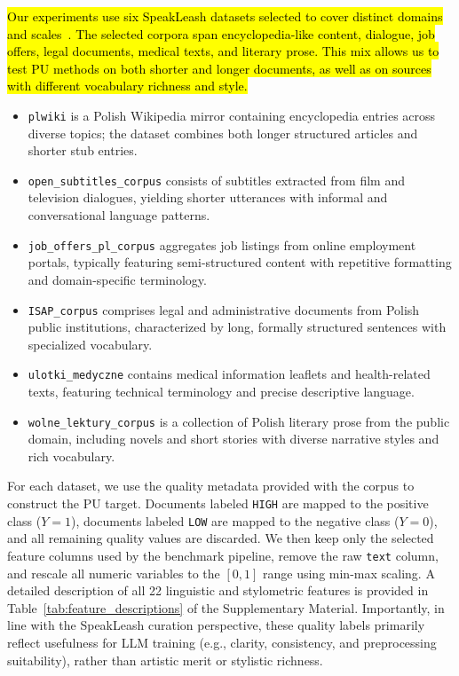 \documentclass[applsci,article,submit,pdftex,moreauthors]{Definitions/mdpi}
\newcommand{\rev}[1]{\hl{#1}}
\begin{document}
\rev{Our experiments use six SpeakLeash datasets selected to cover distinct domains and scales~\cite{speakleash}. The selected corpora span encyclopedia-like content, dialogue, job offers, legal documents, medical texts, and literary prose. This mix allows us to test PU methods on both shorter and longer documents, as well as on sources with different vocabulary richness and style.}

\begin{itemize}
\item \texttt{plwiki} is a Polish Wikipedia mirror containing encyclopedia entries across diverse topics; the dataset combines both longer structured articles and shorter stub entries.
\item \texttt{open\_subtitles\_corpus} consists of subtitles extracted from film and television dialogues, yielding shorter utterances with informal and conversational language patterns.
\item \texttt{job\_offers\_pl\_corpus} aggregates job listings from online employment portals, typically featuring semi-structured content with repetitive formatting and domain-specific terminology.
\item \texttt{ISAP\_corpus} comprises legal and administrative documents from Polish public institutions, characterized by long, formally structured sentences with specialized vocabulary.
\item \texttt{ulotki\_medyczne} contains medical information leaflets and health-related texts, featuring technical terminology and precise descriptive language.
\item \texttt{wolne\_lektury\_corpus} is a collection of Polish literary prose from the public domain, including novels and short stories with diverse narrative styles and rich vocabulary.
\end{itemize}

For each dataset, we use the quality metadata provided with the corpus to construct the PU target. Documents labeled \texttt{HIGH} are mapped to the positive class ($Y=1$), documents labeled \texttt{LOW} are mapped to the negative class ($Y=0$), and all remaining quality values are discarded. We then keep only the selected feature columns used by the benchmark pipeline, remove the raw \texttt{text} column, and rescale all numeric variables to the $[0,1]$ range using min-max scaling. A detailed description of all 22 linguistic and stylometric features is provided in Table~\ref{tab:feature_descriptions} of the Supplementary Material. Importantly, in line with the SpeakLeash curation perspective, these quality labels primarily reflect usefulness for LLM training (e.g., clarity, consistency, and preprocessing suitability), rather than artistic merit or stylistic richness.
\end{document}
